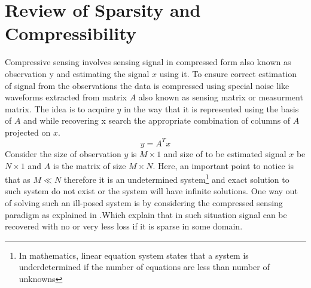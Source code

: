 \section{Review of Sparsity and Compressibility}
Compressive sensing involves sensing signal in compressed form also known as observation y and estimating the signal $x$ using it. To ensure correct estimation of signal from the observations the data is compressed using special noise like waveforms extracted from matrix $A$ also known as sensing matrix or measurment matrix. The idea is to acquire $y$ in the way that it is represented using the basis of  $A$ and while recovering x search the appropriate combination of columns of  $A$ projected on $x$.  
\begin{equation}
    y=A^T x
\end{equation}
Consider the size of observation $y$ is $M \times 1$ and size of to be estimated signal $x$ be $N \times 1$ and  $A$ is the matrix of size $M \times N$. 
Here, an important point to notice is that as $M\ll N$ therefore it is an undetermined system\footnote{In mathematics, linear equation system states that a system is underdetermined if the number of equations are less than number of unknowns} and exact solution to such system do not exist or the system will have infinite solutions. One way out of solving such an ill-posed system is by considering the compressed sensing paradigm as explained in \cite{Candes08}.Which explain that in such  situation signal can be recovered with no or very less loss if it is sparse in some domain.


